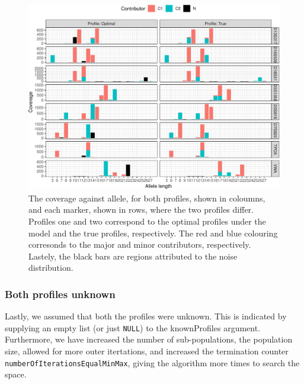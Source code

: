 \documentclass[]{article}
\begin{document}
\begin{figure}[ht!]

{\centering \includegraphics{MPSMixturesVignette_files/figure-latex/figDifference-1} 

}

\caption{\label{fig:minor}The coverage against allele, for both profiles, shown in coloumns, and each marker, shown in rows, where the two profiles differ. Profiles one and two correspond to the optimal profiles under the model and the true profiles, respectively. The red and blue colouring corresonds to the major and minor contributors, respectively. Lastely, the black bars are regions attributed to the noise distribution.}\label{fig:figDifference}
\end{figure}

\subsubsection{Both profiles unknown}\label{both-profiles-unknown}

Lastly, we assumed that both the profiles were unknown. This is
indicated by supplying an empty list (or just \texttt{NULL}) to the
knownProfiles argument. Furthermore, we have increased the number of
sub-populations, the population size, allowed for more outer
itertations, and increased the termination counter
\texttt{numberOfIterationsEqualMinMax}, giving the algorithm more times
to search the space.
\end{document}
